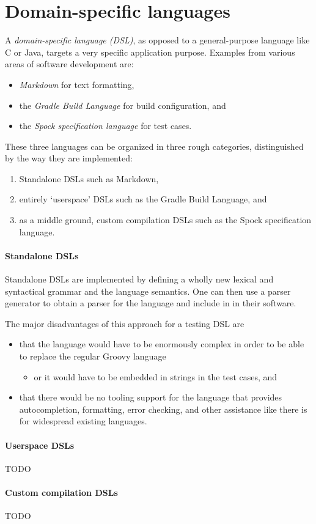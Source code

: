 \section{Domain-specific languages}
A \textit{domain-specific language (DSL)},
as opposed to a general-purpose language like C or Java,
targets a very specific application purpose.
Examples from various areas of software development are:
\begin{itemize}
  \item \textit{Markdown} for text formatting, \autocite{MarkdownIntro}
  \item the \textit{Gradle Build Language} for build configuration, \autocite{GradleWritingBuildScripts} and
  \item the \textit{Spock specification language} for test cases. \autocite{SpockFrameworkDoc}
\end{itemize}

These three languages can be organized in three rough categories,
distinguished by the way they are implemented:
\begin{enumerate}
  \item Standalone DSLs such as Markdown,
  \item entirely `userspace' DSLs such as the Gradle Build Language, and
  \item as a middle ground, custom compilation DSLs such as the Spock specification language.
\end{enumerate}

\paragraph{Standalone DSLs}
Standalone DSLs are implemented by defining a wholly new
lexical and syntactical grammar and the language semantics.
One can then use a parser generator to obtain a parser for the language
and include in in their software.

The major disadvantages of this approach for a testing DSL are
\begin{itemize}
  \item that the language would have to be enormously complex
    in order to be able to replace the regular Groovy language
    \begin{itemize}
      \item or it would have to be embedded in strings in the test cases, and
    \end{itemize}
  \item that there would be no tooling support for the language
    that provides autocompletion, formatting, error checking, and other assistance
    like there is for widespread existing languages.
\end{itemize}

\paragraph{Userspace DSLs}
TODO

\paragraph{Custom compilation DSLs}
TODO
